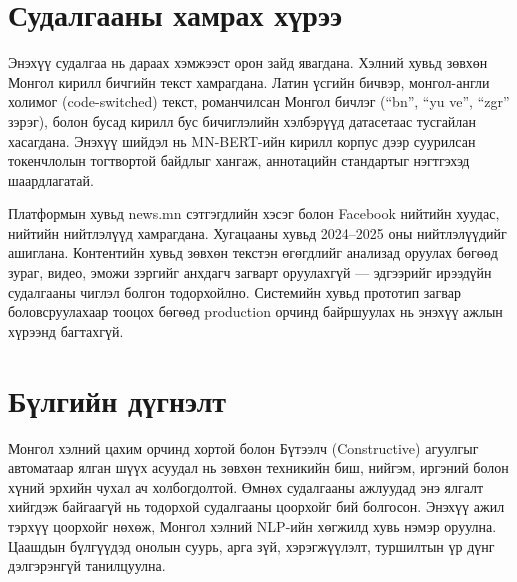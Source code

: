 \section*{Судалгааны хамрах хүрээ}

Энэхүү судалгаа нь дараах хэмжээст орон зайд явагдана. Хэлний хувьд зөвхөн
Монгол кирилл бичгийн текст хамрагдана. Латин үсгийн бичвэр, монгол-англи
холимог (code-switched) текст, романчилсан Монгол бичлэг (``bn'', ``yu ve'',
``zgr'' зэрэг), болон бусад кирилл бус бичиглэлийн хэлбэрүүд датасетаас
тусгайлан хасагдана. Энэхүү шийдэл нь MN-BERT-ийн кирилл корпус дээр суурилсан
токенчлолын тогтвортой байдлыг хангаж, аннотацийн стандартыг нэгтгэхэд
шаардлагатай.

Платформын хувьд news.mn сэтгэгдлийн хэсэг болон Facebook нийтийн хуудас,
нийтийн нийтлэлүүд хамрагдана. Хугацааны хувьд 2024--2025 оны нийтлэлүүдийг
ашиглана. Контентийн хувьд зөвхөн текстэн өгөгдлийг анализад оруулах бөгөөд
зураг, видео, эможи зэргийг анхдагч загварт оруулахгүй --- эдгээрийг ирээдүйн
судалгааны чиглэл болгон тодорхойлно. Системийн хувьд прототип загвар
боловсруулахаар тооцох бөгөөд production орчинд байршуулах нь энэхүү ажлын
хүрээнд багтахгүй.

\section*{Бүлгийн дүгнэлт}

Монгол хэлний цахим орчинд хортой болон Бүтээлч (Constructive) агуулгыг
автоматаар ялган шүүх асуудал нь зөвхөн техникийн биш, нийгэм, иргэний болон
хүний эрхийн чухал ач холбогдолтой. Өмнөх судалгааны ажлуудад энэ ялгалт
хийгдэж байгаагүй нь тодорхой судалгааны цоорхойг бий болгосон. Энэхүү ажил
тэрхүү цоорхойг нөхөж, Монгол хэлний NLP-ийн хөгжилд хувь нэмэр оруулна.
Цаашдын бүлгүүдэд онолын суурь, арга зүй, хэрэгжүүлэлт, туршилтын үр дүнг
дэлгэрэнгүй танилцуулна.
